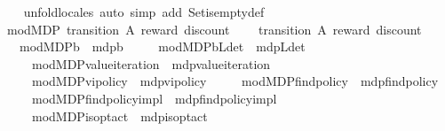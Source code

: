 \begin{isabellebody}
%
\isadelimproof
\ \ %
\endisadelimproof
%
\isatagproof
{}\isamarkupfalse%
\ unfold{\isacharunderscore}{\kern0pt}locales\ {\isacharparenleft}{\kern0pt}auto\ simp\ add{\isacharcolon}{\kern0pt}\ Set{\isachardot}{\kern0pt}is{\isacharunderscore}{\kern0pt}empty{\isacharunderscore}{\kern0pt}def{\isacharparenright}{\kern0pt}%
\endisatagproof
{\isafoldproof}%
%
\isadelimproof
\isanewline
%
\endisadelimproof
{}\isamarkupfalse%
\isanewline
\isanewline
{}\isamarkupfalse%
\ mod{\isacharunderscore}{\kern0pt}MDP\ transition\ A\ reward\ discount\ \isanewline
\ \ \ transition\ A\ reward\ discount\ \isanewline
\ \ \ mod{\isacharunderscore}{\kern0pt}MDP{\isacharunderscore}{\kern0pt}{\isasymL}\isactrlsub b\ {\isacharequal}{\kern0pt}\ mdp{\isachardot}{\kern0pt}{\isasymL}\isactrlsub b\isanewline
\ \ \ \ \ mod{\isacharunderscore}{\kern0pt}MDP{\isacharunderscore}{\kern0pt}{\isasymL}\isactrlsub b{\isacharunderscore}{\kern0pt}L{\isacharunderscore}{\kern0pt}det\ {\isacharequal}{\kern0pt}\ mdp{\isachardot}{\kern0pt}L{\isacharunderscore}{\kern0pt}det\isanewline
\ \ \ \ \ mod{\isacharunderscore}{\kern0pt}MDP{\isacharunderscore}{\kern0pt}value{\isacharunderscore}{\kern0pt}iteration\ {\isacharequal}{\kern0pt}\ mdp{\isachardot}{\kern0pt}value{\isacharunderscore}{\kern0pt}iteration\isanewline
\ \ \ \ \ mod{\isacharunderscore}{\kern0pt}MDP{\isacharunderscore}{\kern0pt}vi{\isacharunderscore}{\kern0pt}policy{\isacharprime}{\kern0pt}\ {\isacharequal}{\kern0pt}\ mdp{\isachardot}{\kern0pt}vi{\isacharunderscore}{\kern0pt}policy{\isacharprime}{\kern0pt}\isanewline
\ \ \ \ \ mod{\isacharunderscore}{\kern0pt}MDP{\isacharunderscore}{\kern0pt}find{\isacharunderscore}{\kern0pt}policy{\isacharprime}{\kern0pt}\ {\isacharequal}{\kern0pt}\ mdp{\isachardot}{\kern0pt}find{\isacharunderscore}{\kern0pt}policy{\isacharprime}{\kern0pt}\isanewline
\ \ \ \ \ mod{\isacharunderscore}{\kern0pt}MDP{\isacharunderscore}{\kern0pt}find{\isacharunderscore}{\kern0pt}policy{\isacharunderscore}{\kern0pt}impl\ {\isacharequal}{\kern0pt}\ mdp{\isachardot}{\kern0pt}find{\isacharunderscore}{\kern0pt}policy{\isacharunderscore}{\kern0pt}impl\isanewline
\ \ \ \ \ mod{\isacharunderscore}{\kern0pt}MDP{\isacharunderscore}{\kern0pt}is{\isacharunderscore}{\kern0pt}opt{\isacharunderscore}{\kern0pt}act\ {\isacharequal}{\kern0pt}\ mdp{\isachardot}{\kern0pt}is{\isacharunderscore}{\kern0pt}opt{\isacharunderscore}{\kern0pt}act\isanewline

\end{isabellebody}
